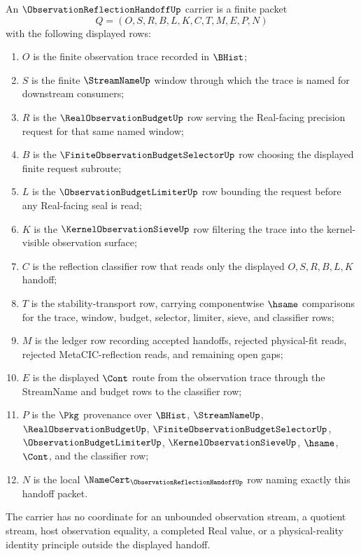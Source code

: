 \begin{definition}
\label{def:observation-reflection-handoff-carrier}
An $\ObservationReflectionHandoffUp$ carrier is a finite packet
$$
Q=(O,S,R,B,L,K,C,T,M,E,P,N)
$$
with the following displayed rows:
\begin{enumerate}
\item $O$ is the finite observation trace recorded in $\BHist$;
\item $S$ is the finite $\StreamNameUp$ window through which the trace is named for downstream consumers;
\item $R$ is the $\RealObservationBudgetUp$ row serving the Real-facing precision request for that same named window;
\item $B$ is the $\FiniteObservationBudgetSelectorUp$ row choosing the displayed finite request subroute;
\item $L$ is the $\ObservationBudgetLimiterUp$ row bounding the request before any Real-facing seal is read;
\item $K$ is the $\KernelObservationSieveUp$ row filtering the trace into the kernel-visible observation surface;
\item $C$ is the reflection classifier row that reads only the displayed $O,S,R,B,L,K$ handoff;
\item $T$ is the stability-transport row, carrying componentwise $\hsame$ comparisons for the trace, window, budget, selector, limiter, sieve, and classifier rows;
\item $M$ is the ledger row recording accepted handoffs, rejected physical-fit reads, rejected MetaCIC-reflection reads, and remaining open gaps;
\item $E$ is the displayed $\Cont$ route from the observation trace through the StreamName and budget rows to the classifier row;
\item $P$ is the $\Pkg$ provenance over $\BHist$, $\StreamNameUp$, $\RealObservationBudgetUp$, $\FiniteObservationBudgetSelectorUp$, $\ObservationBudgetLimiterUp$, $\KernelObservationSieveUp$, $\hsame$, $\Cont$, and the classifier row;
\item $N$ is the local $\NameCert_{\ObservationReflectionHandoffUp}$ row naming exactly this handoff packet.
\end{enumerate}
The carrier has no coordinate for an unbounded observation stream, a quotient stream, host observation equality, a completed Real value, or a physical-reality identity principle outside the displayed handoff.
\end{definition}

